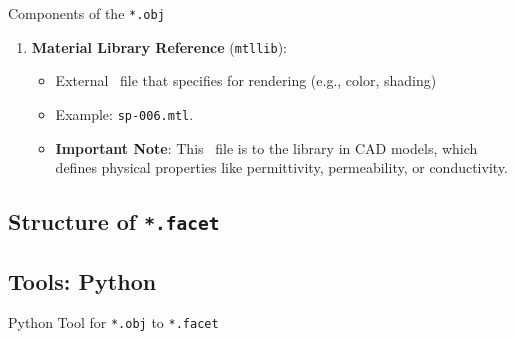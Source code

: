 \begin{frame}{Components of the \texttt{*.obj}}
    \begin{enumerate}
         \setcounter{enumi}{\value{listnumber}}
        \item \textbf{Material Library Reference} (\texttt{mtllib}):

        \begin{itemize}
        		\item External \mtl \ file that specifies  for rendering (e.g., color, shading) %
        		\item Example: \texttt{sp-006.mtl}.
        		\item \textbf{Important Note}:  
              	This \mtl \ file is  to the  library in CAD models, which defines physical properties like permittivity, permeability, or conductivity.%
    \end{itemize}
    \end{enumerate}
\end{frame}

\subsection{Structure of \texttt{*.facet}}

\subsection{Tools: Python}
\renewcommand{\listingFontSize}{\tiny} 
\begin{frame}{Python Tool for \texttt{*.obj} to \texttt{*.facet}}
    \lstset{style=python} %
    
\end{frame}

